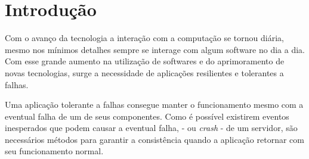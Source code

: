 \documentclass[12pt,
openright, 
oneside,
a4paper,
brazil]{facom-ufu-abntex2}
\theoremstyle{definition}
\begin{document}
\imprimircapa
\imprimirfolhaderosto









\tableofcontents*
\cleardoublepage


\textual

\chapter{Introdução}

Com o avanço da tecnologia a interação com a computação se tornou diária, mesmo
nos mínimos detalhes sempre se interage com algum software no dia a dia. Com
esse grande aumento na utilização de softwares e do aprimoramento de novas tecnologias, 
surge a necessidade de aplicações resilientes e tolerantes a falhas. 

Uma aplicação tolerante a falhas consegue manter o funcionamento mesmo com a eventual 
falha de um de seus componentes. Como é possível existirem eventos inesperados que podem
causar a eventual falha, - ou \textit{crash} - de um servidor, são necessários métodos
para garantir a consistência quando a aplicação retornar com seu funcionamento
normal. 
\end{document}
